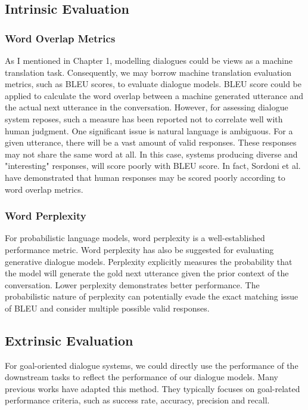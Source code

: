 \documentclass[bsc,frontabs,twoside,singlespacing,parskip,deptreport]{infthesis}     %
\begin{document}
\subsection{Intrinsic Evaluation}

\subsubsection*{Word Overlap Metrics}

As I mentioned in Chapter 1, modelling dialogues could be views as a machine translation task. Consequently, we may borrow machine translation evaluation metrics, such as BLEU scores\cite{papineni2002bleu}, to evaluate dialogue models. BLEU score could be applied to calculate the word overlap between a machine generated utterance and the actual next utterance in the conversation. However, for assessing dialogue system reposes, such a measure has been reported not to correlate well with human judgment\cite{liu2016not}. One significant issue is natural language is ambiguous. For a given utterance, there will be a vast amount of valid responses. These responses may not share the same word at all. In this case, systems producing diverse and "interesting" responses, will score poorly with BLEU score. In fact, Sordoni et al. have demonstrated that human responses may be scored poorly according to word overlap metrics\cite{sordoni2015neural}.

\subsubsection*{Word Perplexity}

For probabilistic language models, word perplexity is a well-established performance metric\cite{bengio2003neural,mikolov2010recurrent}. Word perplexity has also be suggested for evaluating generative dialogue models\cite{pietquin2013survey}. Perplexity explicitly measures the probability that the model will generate the gold next utterance given the prior context of the conversation. Lower perplexity demonstrates better performance. The probabilistic nature of perplexity can potentially evade the exact matching issue of BLEU and consider multiple possible valid responses.

\subsection{Extrinsic Evaluation}

For goal-oriented dialogue systems, we could directly use the performance of the downstream tasks to reflect the performance of our dialogue models. Many previous works\cite{strub2017end,shekhar2017foil,reddy2019coqa,zhou2018dataset,de2017guesswhat,das2017visual,das2017learning} have adapted this method. They typically focuses on goal-related performance criteria, such as success rate, accuracy, precision and recall.
\end{document}

